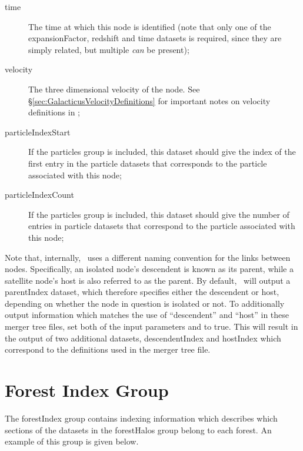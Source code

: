 \begin{description}
 \item [{\normalfont \ttfamily time}] The time at which this node is identified (note that only one of the {\normalfont \ttfamily expansionFactor}, {\normalfont \ttfamily redshift} and {\normalfont \ttfamily time} datasets is required, since they are simply related, but multiple \emph{can} be present);
 \item [{\normalfont \ttfamily velocity}] The three dimensional velocity of the node. See \S\ref{sec:GalacticusVelocityDefinitions} for important notes on velocity definitions in \glc;
 \item [{\normalfont \ttfamily particleIndexStart}] If the {\normalfont \ttfamily particles} group is included, this dataset should give the index of the first entry in the particle datasets that corresponds to the particle associated with this node;
 \item [{\normalfont \ttfamily particleIndexCount}] If the {\normalfont \ttfamily particles} group is included, this dataset should give the number of entries in particle datasets that correspond to the particle associated with this node;
\end{description}

Note that, internally, \glc\ uses a different naming convention for the links between nodes. Specifically, an isolated node's descendent is known as its parent, while a satellite node's host is also referred to as the parent. By default, \glc\ will output a {\normalfont \ttfamily parentIndex} dataset, which therefore specifies either the descendent or host, depending on whether the node in question is isolated or not. To additionally output information which matches the use of ``descendent'' and ``host'' in these merger tree files, set both of the input parameters {\normalfont \ttfamily [outputDescendentIndices]} and {\normalfont \ttfamily [outputHostIndices]} to {\normalfont \ttfamily true}. This will result in the output of two additional datasets, {\normalfont \ttfamily descendentIndex} and {\normalfont \ttfamily hostIndex} which correspond to the definitions used in the merger tree file.

\section{Forest Index Group}

The {\normalfont \ttfamily forestIndex} group contains indexing information which describes which sections of the datasets in the {\normalfont \ttfamily forestHalos} group belong to each forest. An example of this group is given below.

